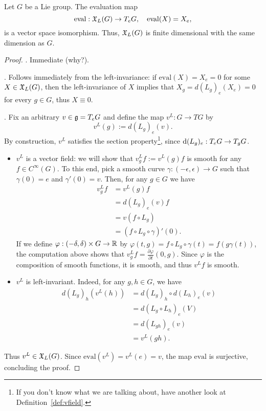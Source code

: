 \begin{theorem}
	Let $G$ be a Lie group. The evaluation map
	\begin{equation}
		\mathrm{eval}:\mathfrak{X}_L(G)\to T_eG, \quad
		\mathrm{eval}(X) = X_e,
	\end{equation}
	is a vector space isomorphism.
	Thus, $\mathfrak{X}_L(G)$ is finite dimensional with the same dimension as $G$.
\end{theorem}
\begin{proof}
	. Immediate (why?).

	. Follows immediately from the left-invariance: if $\mathrm{eval}(X) = X_e = 0$ for some $X\in\mathfrak{X}_L(G)$, then the left-invariance of $X$ implies that $X_g = d(L_g)_e(X_e) = 0$ for every $g\in G$, thus $X\equiv0$.

	.
	Fix an arbitrary $v\in \mathfrak{g} = T_eG$ and define the map $v^L:G\to TG$ by
	\begin{equation}
		v^L(g) := d(L_g)_e(v).
	\end{equation}
	By construction, $v^L$ satisfies the section property\footnote{If you don't know what we are talking about, have another look at Definition~\ref{def:vfield}.}, since $\operatorname{d}(L_g)_e:T_eG\to T_gG$.
	\begin{itemize}
		\item $v^L$ is a vector field: we will show that $v^L_g f := v^L(g) f$ is smooth for any $f\in C^\infty(G)$.
		      To this end, pick a smooth curve $\gamma:(-\epsilon,\epsilon)\to G$ such that $\gamma(0)=e$ and $\gamma'(0) = v$. Then, for any $g\in G$ we have
		      \begin{align}
			      v^L_g f & = v^L(g) f                      \\
			              & = d(L_g)_e(v) f                 \\
			              & = v(f\circ L_g)                 \\
			              & = (f\circ L_g\circ \gamma)'(0).
		      \end{align}
		      If we define $\varphi:(-\delta, \delta)\times G \to \mathbb{R}$ by $\varphi(t,g) = f\circ L_g\circ \gamma(t) = f(g\gamma(t))$, the computation above shows that $v^L_gf = \frac{\partial \varphi}{\partial t}(0, g)$.
		      Since $\varphi$ is the composition of smooth functions, it is smooth, and thus $v^L f$ is smooth.
		\item $v^L$ is left-invariant.
		      Indeed, for any $g,h\in G$, we have
		      \begin{align}
			      d(L_g)_h(v^L(h)) & = d(L_g)_h\circ d(L_h)_e(v) \\
			                       & = d(L_g\circ L_h)_e(V)      \\
			                       & = d(L_{gh})_e(v)            \\
			                       & = v^L(gh).
		      \end{align}
	\end{itemize}
	Thus $v^L\in\mathfrak{X}_L(G)$.
	Since $\mathrm{eval}(v^L) = v^L(e) = v$, the map $\mathrm{eval}$ is surjective, concluding the proof.
\end{proof}

